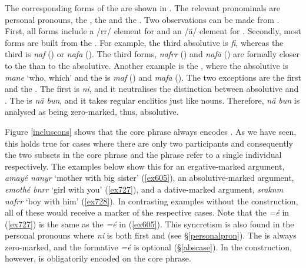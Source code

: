 The corresponding  forms of the   are shown in . The relevant pronominals are personal pronouns, the  , the   and the . Two observations can be made from . First, all forms include a /rr/ element for  and an /ä/ element for . Secondly, most forms are built from the  . For example, the third  absolutive is \emph{fi}, whereas the third   is \emph{naf} (\Sg) or \emph{nafa} (\Nsg). The  third  forms, \emph{nafrr} (\Du) and \emph{nafä} (\Pl) are formally closer to the  than to the absolutive. Another example is the , where the absolutive is \emph{mane} `who, which' and the  is \emph{maf} (\Sg) and \emph{mafa} (\Nsg). The two exceptions are the first  and the  . The first   is \emph{ni}, and it neutralises the distinction between absolutive and . The   is \emph{nä bun}, and it takes regular  enclitics just like nouns. Therefore, \emph{nä bun} is analysed as being zero-marked, thus, absolutive.%

Figure \ref{incluscons} shows that the core phrase always encodes  . As we have seen, this holds true for cases where there are only two participants and consequently the two subsets in the core phrase and the  phrase refer to a single individual respectively. The examples below show this for an ergative-marked argument, \emph{amayé nanyr} `mother with big sister' (\ref{ex605}), an absolutive-marked argument, \emph{emothé bnrr} `girl with you' (\ref{ex727}), and a dative-marked argument, \emph{sraknm nafrr} `boy with him' (\ref{ex728}). In contrasting examples without the  construction, all of these would receive a  marker of the respective cases. Note that the   \emph{=é} in (\ref{ex727}) is the same as the   \emph{=é} in (\ref{ex605}). This syncretism is also found in the personal pronouns where \emph{ni} is both first    and  (see \S{}\ref{personalpron}). The   is always zero-marked, and the  formative \emph{=é} is optional (\S{}\ref{abscase}). In the  construction, however,   is obligatorily encoded on the core phrase.

